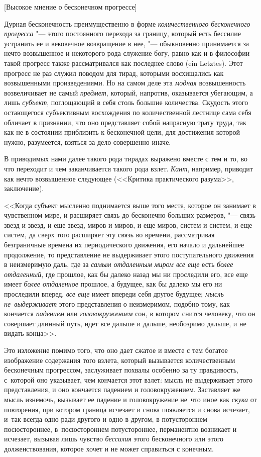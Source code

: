 %
{[Высокое мнение о бесконечном прогрессе]}

Дурная бесконечность преимущественно в форме
{\em количественного бесконечного прогресса} "--- этого постоянного перехода за
границу, который есть бессилие устранить ее и вековечное возвращение в нее,
"--- обыкновенно принимается за нечто возвышенное и некоторого рода служение
богу, равно как и в философии такой прогресс также рассматривался как последнее
слово (ein Letztes). Этот прогресс не раз служил поводом для тирад, которыми
восхищались как возвышенными произведениями. Но на самом деле эта {\em модная}
возвышенность возвеличивает не самый {\em предмет}, который, напротив,
оказывается убегающим, а лишь {\em субъект}, поглощающий в себя столь большие
количества. Скудость этого остающегося субъективным восхождения по
количественной лестнице сама себя обличает в признании, что оно представляет
собой напрасную трату труда, так как не в состоянии приблизить к бесконечной
цели, для достижения которой нужно, разумеется, взяться за дело совершенно
иначе.

В приводимых нами далее такого рода тирадах выражено вместе с тем и то, во что
переходит и чем заканчивается такого рода взлет. {\em Кант}, например, приводит
как нечто возвышенное следующее (<<Критика практического разума>>, заключение).

<<Когда субъект мысленно поднимается выше того места, которое он занимает в
чувственном мире, и расширяет связь до бесконечно больших размеров, "--- связь
звезд и звезд, и еще звезд, миров и миров, и еще миров, систем и систем, и еще
систем, да сверх того расширяет эту связь во времени, рассматривая безграничные
времена их периодического движения, его начало и дальнейшее продолжение, то
представление не выдерживает этого поступательного движения в неизмеримую даль,
где за {\em самым отдаленным миром все еще} есть {\em более отдаленный}, где
прошлое, как бы далеко назад мы ни проследили его, все еще имеет
{\em более отдаленное} прошлое, а будущее, как бы далеко мы его ни проследили
вперед, {\em все еще} имеет впереди себя другое будущее;
{\em мысль не~выдерживает} этого представления о неизмеримом, подобно тому, как
кончается {\em падением} или {\em головокружением} сон, в котором снится
человеку, что он совершает длинный путь, идет все дальше и дальше, необозримо
дальше, и не видать конца>>.

Это изложение помимо того, что оно дает сжатое и вместе с тем богатое
изображение содержания того взлета, который вызывается количественным
бесконечным прогрессом, заслуживает похвалы особенно за ту правдивость,
с~которой оно указывает, чем кончается этот взлет: мысль не выдерживает этого
представления, и оно кончается падением и головокружением. Заставляет же мысль
изнемочь, вызывает ее падение и головокружение не~что иное как {\em скука} от
повторения, при котором граница исчезает и снова появляется и снова исчезает,
и~так всегда одно ради другого и одно в другом, в потустороннем посюстороннее,
в~посюстороннем потустороннее, перманентно возникает и исчезает, вызывая лишь
чувство {\em бессилия} этого бесконечного или этого долженствования, которое
хочет и не может справиться с конечным.

